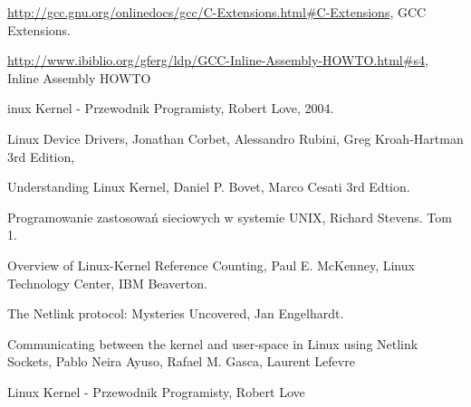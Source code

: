 \documentclass[10pt]{article}
\begin{document}
\begin{thebibliography}{99}

    \url{http://gcc.gnu.org/onlinedocs/gcc/C-Extensions.html#C-Extensions},
    GCC Extensions.

    \url{http://www.ibiblio.org/gferg/ldp/GCC-Inline-Assembly-HOWTO.html#s4},
    Inline Assembly HOWTO

    inux Kernel - Przewodnik Programisty,
    Robert Love,
    2004.

    Linux Device Drivers,
    Jonathan Corbet, Alessandro Rubini, Greg Kroah-Hartman
    3rd Edition,

    Understanding Linux Kernel,
    Daniel P. Bovet, Marco Cesati
    3rd Edtion.

    Programowanie zastosowań sieciowych w systemie UNIX,
    Richard Stevens.
    Tom 1.

    Overview of Linux-Kernel Reference Counting,
    Paul E. McKenney,
    Linux Technology Center,
    IBM Beaverton.

    The Netlink protocol: Mysteries Uncovered,
    Jan Engelhardt.

    Communicating between the kernel and user-space in Linux using Netlink Sockets,
    Pablo Neira Ayuso, Rafael M. Gasca, Laurent Lefevre

    Linux Kernel - Przewodnik Programisty,
    Robert Love

\end{thebibliography}
\end{document}
